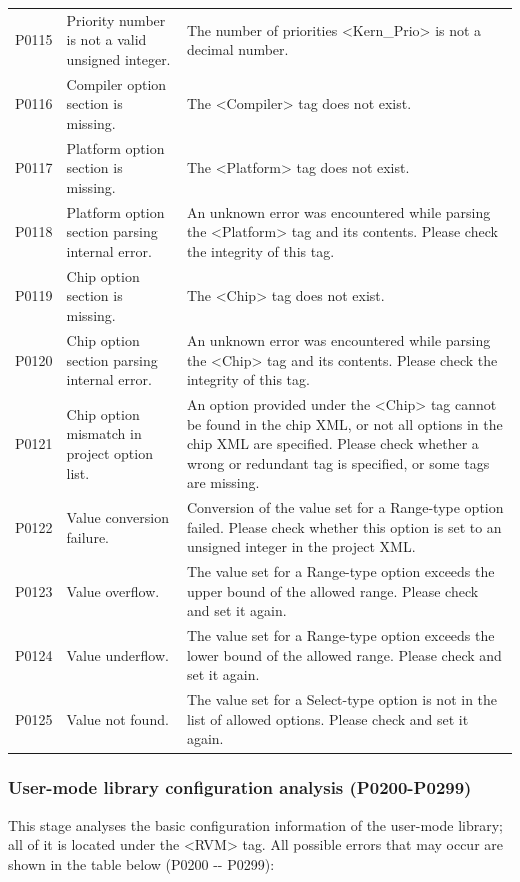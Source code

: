 \begin{xltabular}{\textwidth}{@{}>{\hsize\raggedright\arraybackslash}X>{\hsize\raggedright\arraybackslash}X>{\hsize\raggedright\arraybackslash}X@{}}
P0115 & Priority number is not a valid unsigned integer. &
The number of priorities <Kern\_\allowbreak{}Prio> is not a decimal number.\tabularnewline
P0116 & Compiler option section is missing. &
The <Compiler> tag does not exist.\tabularnewline
P0117 & Platform option section is missing. &
The <Platform> tag does not exist.\tabularnewline
P0118 & Platform option section parsing internal error. &
An unknown error was encountered while parsing the <Platform> tag and its contents. Please check the integrity of this tag.\tabularnewline
P0119 & Chip option section is missing. &
The <Chip> tag does not exist.\tabularnewline
P0120 & Chip option section parsing internal error. &
An unknown error was encountered while parsing the <Chip> tag and its contents. Please check the integrity of this tag.\tabularnewline
P0121 & Chip option mismatch in project option list. &
An option provided under the <Chip> tag cannot be found in the chip XML, or not all options in the chip XML are specified. Please check whether a wrong or redundant tag is specified, or some tags are missing.\tabularnewline
P0122 & Value conversion failure. &
Conversion of the value set for a Range-type option failed. Please check whether this option is set to an unsigned integer in the project XML.\tabularnewline
P0123 & Value overflow. &
The value set for a Range-type option exceeds the upper bound of the allowed range. Please check and set it again.\tabularnewline
P0124 & Value underflow. &
The value set for a Range-type option exceeds the lower bound of the allowed range. Please check and set it again.\tabularnewline
P0125 & Value not found. &
The value set for a Select-type option is not in the list of allowed options. Please check and set it again.\tabularnewline
\end{xltabular}

\subsubsection{User-mode library configuration analysis (P0200-P0299)}\label{subsubsec:5-6-2-3}

This stage analyses the basic configuration information of the user-mode library; all of it is located under the <RVM> tag. All possible errors that may occur are shown in the table below (P0200
-\/- P0299):

